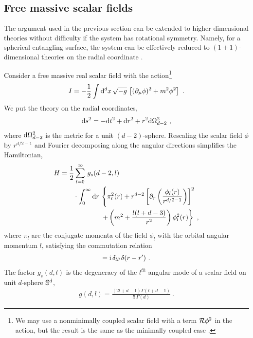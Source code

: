 \subsection{Free massive scalar fields}
The argument used in the previous section can be extended to higher-dimensional theories without difficulty if the system has rotational symmetry.
Namely, for a spherical entangling surface, the system can be effectively reduced to $(1+1)$-dimensional theories on the radial coordinate \cite{Srednicki:1993im,Lohmayer:2009sq,Huerta:2011qi}.

Consider a free massive real scalar field with the action\footnote{We may use a nonminimally coupled scalar field with a term ${\cal R} \phi^2$ in the action, but the result is the same as the minimally coupled case \cite{Casini:2014yca,Herzog:2016bhv}.}
\begin{align}\label{Scalar_action_L}
	I = -\frac{1}{2} \int \mathrm{d}^d x\, \sqrt{-g}\,\left[ (\partial_\mu\phi)^2 + m^2 \phi^2 \right] \ .
\end{align}
We put the theory on the radial coordinates, 
\begin{align}\label{RadialLattice}
	\mathrm{d} s^2 = -\mathrm{d} t^2 + \mathrm{d} r^2 + r^2 \mathrm{d}\Omega_{d-2}^2 \ ,
\end{align}
where $\mathrm{d}\Omega_{d-2}^2$ is the metric for a unit $(d-2)$-sphere.
Rescaling the scalar field $\phi$ by $r^{d/2-1}$ and Fourier decomposing along the angular directions simplifies the Hamiltonian,
\begin{align}
\begin{aligned}
	H &= \frac{1}{2} \sum_{l=0}^\infty \,g_s (d-2,l) \\
		&\qquad\cdot \int_0^\infty \mathrm{d} r \, \left\{  \pi^2_l (r) 
	 + r^{d-2}\left[ \partial_r \left( \frac{\phi_l(r)}{r^{d/2 -1}} \right)\right]^2 \right.\\
	&\left. \qquad \qquad \qquad + \left( m^2 + \frac{l(l+d-3)}{r^2}\right) \phi_l^2 (r) \right\} \ ,
\end{aligned}
\end{align}
where $\pi_l$ are the conjugate momenta of the field $\phi_l$ with the orbital angular momentum $l$, satisfying the commutation relation
\begin{align}
	[\phi_l(r), \pi_{l'}(r')] = \i\, \delta_{l l'} \delta(r - r') \ .
\end{align}
The factor $g_s (d,l)$ is the degeneracy of the $l^{th}$ angular mode of a scalar field on unit $d$-sphere $\mathbb{S}^d$,
\begin{align}\label{ScalarDeg}
	g(d,l) = \frac{(2l + d -1) \Gamma(l + d - 1)}{l!\, \Gamma(d)} \ .
\end{align}

